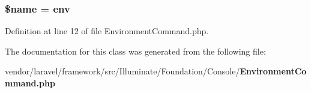 \subsubsection[{\$name}]{\setlength{\rightskip}{0pt plus 5cm}\${\bf name} = \textquotesingle{}env\textquotesingle{}\hspace{0.3cm}{\ttfamily [protected]}}\label{class_illuminate_1_1_foundation_1_1_console_1_1_environment_command_ab2fc40d43824ea3e1ce5d86dee0d763b}


Definition at line 12 of file Environment\+Command.\+php.



The documentation for this class was generated from the following file\+:\begin{DoxyCompactItemize}
\item 
vendor/laravel/framework/src/\+Illuminate/\+Foundation/\+Console/{\bf Environment\+Command.\+php}\end{DoxyCompactItemize}
